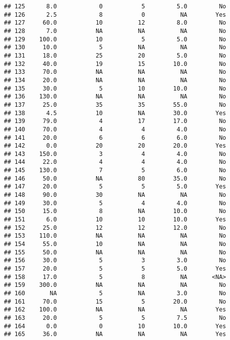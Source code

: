 \documentclass[
]{article}
\begin{document}
\begin{verbatim}
## 125      8.0            0           5         5.0         No
## 126      2.5            8           0          NA        Yes
## 127     60.0           10          12         8.0         No
## 128      7.0           NA          NA          NA         No
## 129    100.0           10           5         5.0         No
## 130     10.0            5          NA          NA         No
## 131     18.0           25          20         5.0         No
## 132     40.0           19          15        10.0         No
## 133     70.0           NA          NA          NA         No
## 134     20.0           NA          NA          NA         No
## 135     30.0            5          10        10.0         No
## 136    130.0           NA          NA          NA         No
## 137     25.0           35          35        55.0         No
## 138      4.5           10          NA        30.0        Yes
## 139     79.0            4          17        17.0         No
## 140     70.0            4           4         4.0         No
## 141     20.0            6           6         6.0         No
## 142      0.0           20          20        20.0        Yes
## 143    150.0            3           4         4.0         No
## 144     22.0            4           4         4.0         No
## 145    130.0            7           5         6.0         No
## 146     50.0           NA          80        35.0         No
## 147     20.0            5           5         5.0        Yes
## 148     90.0           30          NA          NA         No
## 149     30.0            5           4         4.0         No
## 150     15.0            8          NA        10.0         No
## 151      6.0           10          10        10.0        Yes
## 152     25.0           12          12        12.0         No
## 153    110.0           NA          NA          NA         No
## 154     55.0           10          NA          NA         No
## 155     50.0           NA          NA          NA         No
## 156     30.0            5           3         3.0         No
## 157     20.0            5           5         5.0        Yes
## 158     17.0            5           8          NA       <NA>
## 159    300.0           NA          NA          NA         No
## 160       NA            5          NA         3.0         No
## 161     70.0           15           5        20.0         No
## 162    100.0           NA          NA          NA        Yes
## 163     20.0            5           5         7.5         No
## 164      0.0            0          10        10.0        Yes
## 165     36.0           NA          NA          NA        Yes

\end{verbatim}
\end{document}

